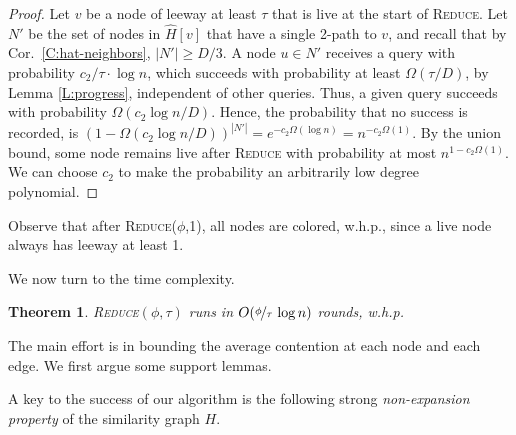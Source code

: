 \documentclass[12pt,a4]{article}
\newtheorem{theorem}{Theorem}[section]
\newcommand{\alg}[1]{\textsc{#1}}
\begin{document}
\begin{proof}
Let $v$ be a node of leeway at least $\tau$ that is live at the start of \alg{Reduce}. 
Let $N'$ be the set of nodes in $\hat{H}[v]$ that have a single 2-path to $v$, and recall that by Cor.~\ref{C:hat-neighbors}, $|N'| \ge D/3$.
A node $u \in N'$ receives a query with probability $c_2/\tau \cdot \log n$, which succeeds with probability at least $\Omega(\tau/D)$, by Lemma \ref{L:progress}, independent of other queries.
Thus, a given query succeeds with probability $\Omega(c_2 \log n / D)$. 
Hence, the probability that no success is recorded, is $(1-\Omega(c_2\log n / D))^{|N'|} = e^{-c_2\Omega(\log n)} = n^{-c_2 \Omega(1)}$.
By the union bound, some node remains live after \alg{Reduce} with probability at most $n^{1-c_2 \Omega(1)}$. 
We can choose $c_2$ to make the probability an arbitrarily low degree polynomial.
\end{proof}

Observe that after \alg{Reduce}($\phi$,1), all nodes are colored, w.h.p., since a live node always has leeway at least 1.

We now turn to the time complexity.

\begin{theorem}
\alg{Reduce}$(\phi,\tau)$ runs in $O(\nicefrac{\phi}{\tau}\, \log n)$ rounds, w.h.p.
\label{thm:reduce-time}
\end{theorem}

The main effort is in bounding the average contention at each node and each edge.
We first argue some support lemmas.


A key to the success of our algorithm is the following strong \emph{non-expansion property} of the similarity graph $H$.
\end{document}
